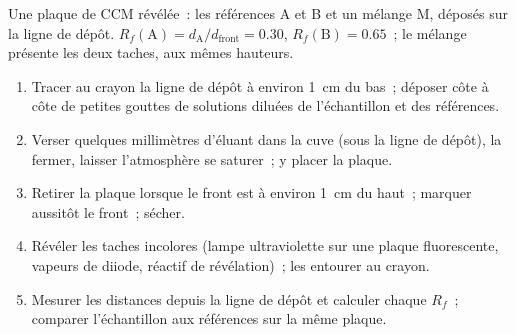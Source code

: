 \begin{omfigure}

{\small Une plaque de CCM révélée~: les références A et B et un mélange
M, déposés sur la ligne de dépôt. $R_f(\mathrm{A}) = d_{\mathrm{A}}/d_{\mathrm{front}}
= 0.30$, $R_f(\mathrm{B}) = 0.65$~; le mélange présente les deux taches,
aux mêmes hauteurs.}
\end{omfigure}

\begin{method}\label{met:b1:lab-techniques-1:tlc}
\begin{enumerate}
  \item Tracer au crayon la ligne de dépôt à environ \qty{1}{cm} du bas~;
        déposer côte à côte de petites gouttes de solutions diluées de
        l'échantillon et des références.
  \item Verser quelques millimètres d'éluant dans la cuve (sous la ligne
        de dépôt), la fermer, laisser l'atmosphère se saturer~; y placer
        la plaque.
  \item Retirer la plaque lorsque le front est à environ \qty{1}{cm} du
        haut~; marquer aussitôt le front~; sécher.
  \item Révéler les taches incolores (lampe ultraviolette sur une plaque
        fluorescente, vapeurs de diiode, réactif de révélation)~; les
        entourer au crayon.
  \item Mesurer les distances depuis la ligne de dépôt et calculer chaque
        $R_f$~; comparer l'échantillon aux références sur la même plaque.
\end{enumerate}
\end{method}


